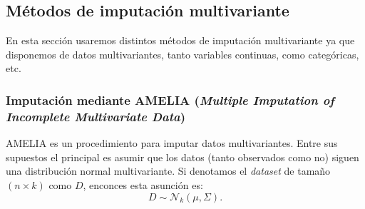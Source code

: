 \documentclass[
  11pt,
  a4paper,
]{article}
\newenvironment{Shaded}{\begin{snugshade}}{\end{snugshade}}
\newcommand{\AttributeTok}[1]{\textcolor[rgb]{0.77,0.63,0.00}{#1}}
\newcommand{\CommentTok}[1]{\textcolor[rgb]{0.56,0.35,0.01}{\textit{#1}}}
\newcommand{\DecValTok}[1]{\textcolor[rgb]{0.00,0.00,0.81}{#1}}
\newcommand{\FunctionTok}[1]{\textcolor[rgb]{0.00,0.00,0.00}{#1}}
\newcommand{\NormalTok}[1]{#1}
\newcommand{\OtherTok}[1]{\textcolor[rgb]{0.56,0.35,0.01}{#1}}
\newcommand{\SpecialCharTok}[1]{\textcolor[rgb]{0.00,0.00,0.00}{#1}}
\newcommand{\StringTok}[1]{\textcolor[rgb]{0.31,0.60,0.02}{#1}}
\begin{document}
\begin{Shaded}
\end{Shaded}

\subsection{Métodos de imputación multivariante}

En esta sección usaremos distintos métodos de imputación multivariante
ya que disponemos de datos multivariantes, tanto variables continuas,
como categóricas, etc.

\subsubsection{Imputación mediante AMELIA (\emph{Multiple Imputation of Incomplete Multivariate Data})}

AMELIA es un procedimiento para imputar datos multivariantes. Entre sus
supuestos el principal es asumir que los datos (tanto observados como
no) siguen una distribución normal multivariante. Si denotamos el
\emph{dataset} de tamaño \((n \times k)\) como \(D\), enconces esta
asunción es: \[
D \sim \mathcal{N}_k(\mu, \Sigma).
\]
\end{document}

